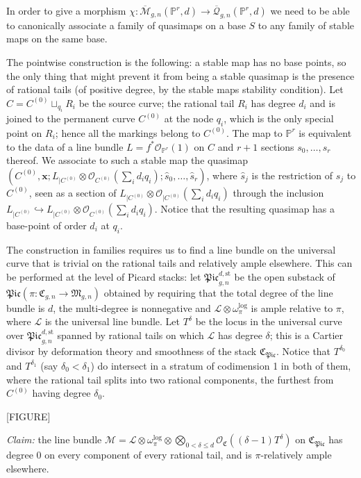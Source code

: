 \documentclass[11pt]{amsart}
\newcommand{\M}[4]{\overline{\mathcal M}_{#1,#2}(#3,#4)}
\newcommand{\Q}[4]{\overline{\mathcal Q}_{#1,#2}(#3,#4)}
\newcommand{\PP}{\mathbb P}
\renewcommand{\to}{\rightarrow}
\newcommand{\comp}{\chi}
\theoremstyle{plain}
\theoremstyle{definition}
\begin{document}
In order to give a morphism $\comp\colon\M{g}{n}{\PP^r}{d}\to\Q{g}{n}{\PP^r}{d}$ we need to be able to canonically associate a family of quasimaps on a base $S$ to any family of stable maps on the same base.

The pointwise construction is the following: a stable map has no base points, so the only thing that might prevent it from being a stable quasimap is the presence of rational tails (of positive degree, by the stable maps stability condition). Let $C=C^{(0)}\sqcup_{q_i}R_i$ be the source curve; the rational tail $R_i$ has degree $d_i$ and is joined to the permanent curve $C^{(0)}$ at the node $q_i$, which is the only special point on $R_i$; hence all the markings belong to $C^{(0)}$. The map to $\PP^r$ is equivalent to the data of a line bundle $L=f^*\mathcal O_{\PP^r}(1)$ on $C$ and $r+1$ sections $s_0,\ldots,s_r$ thereof. We associate to such a stable map the quasimap $(C^{(0)},\mathbf x; L_{|C^{(0)}}\otimes\mathcal O_{C^{(0)}}(\sum_{i}d_iq_i);\hat s_0,\ldots,\hat s_r)$, where $\hat s_j$ is the restriction of $s_j$ to $C^{(0)}$, seen as a section of $L_{|C^{(0)}}\otimes\mathcal O_{|C^{(0)}}(\sum_{i}d_iq_i)$ through the inclusion $L_{|C^{(0)}}\hookrightarrow L_{|C^{(0)}}\otimes\mathcal O_{C^{(0)}}(\sum_{i}d_iq_i)$. Notice that the resulting quasimap has a base-point of order $d_i$ at $q_i$.

The construction in families requires us to find a line bundle on the universal curve that is trivial on the rational tails and relatively ample elsewhere. This can be performed at the level of Picard stacks: let $\mathfrak{Pic}_{g,n}^{d,\text{st}}$ be the open substack of $\mathfrak{Pic}(\pi\colon\mathfrak{C}_{g,n}\to\mathfrak{M}_{g,n})$ obtained by requiring that the total degree of the line bundle is $d$, the multi-degree is nonnegative and $\mathcal L\otimes\omega_{\pi}^{\text{log}}$ is ample relative to $\pi$, where $\mathcal L$ is the universal line bundle. Let $T^{\delta}$ be the locus in the universal curve over $\mathfrak{Pic}_{g,n}^{d,\text{st}}$ spanned by rational tails on which $\mathcal L$ has degree $\delta$; this is a Cartier divisor by deformation theory and smoothness of the stack $\mathfrak{C}_{\mathfrak{Pic}}$. Notice that $T^{\delta_0}$ and $T^{\delta_1}$ (say $\delta_0<\delta_1$) do intersect in a stratum of codimension 1 in both of them, where the rational tail splits into two rational components, the furthest from $C^{(0)}$ having degree $\delta_0$.

[FIGURE]

\emph{Claim:} the line bundle $\mathcal M=\mathcal L\otimes\omega_{\pi}^{\text{log}}\otimes\bigotimes_{0<\delta\leq d}\mathcal O_{\mathfrak C}((\delta-1) T^\delta)$ on $\mathfrak{C}_{\mathfrak{Pic}}$ has degree 0 on every component of every rational tail, and is $\pi$-relatively ample elsewhere.
\end{document}
